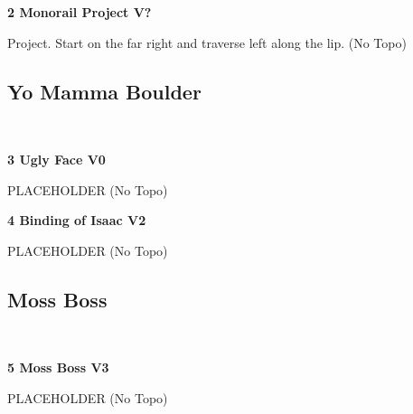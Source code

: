 \begin{multicols}{2}
					\begin{minipage}{\linewidth}	
					\label{rt:Monorail Project}
\colorbox{black!20}{
\textbf{
2 Monorail Project V?  
}
}

					\begin{adjustwidth}{0.5cm}{}				
					Project. Start on the far right and traverse left along the lip.
						\newline (No Topo) 
					\end{adjustwidth}
					\end{minipage}
			\subsection*{Yo Mamma Boulder}\label{bf:Yo Mamma Boulder}
			\begin{minipage}{\columnwidth}
			\
			\end{minipage}
			
					\begin{minipage}{\linewidth}	
					\label{rt:Ugly Face}
\colorbox{green!20}{
\textbf{
3 Ugly Face V0 \ding{72}  \warn 
}
}

					\begin{adjustwidth}{0.5cm}{}				
					PLACEHOLDER
						\newline (No Topo) 
					\end{adjustwidth}
					\end{minipage}
					\begin{minipage}{\linewidth}	
					\label{rt:Binding of Isaac}
\colorbox{green!20}{
\textbf{
4 Binding of Isaac V2  \ding{72}  \warn 
}
}

					\begin{adjustwidth}{0.5cm}{}				
					PLACEHOLDER
						\newline (No Topo) 
					\end{adjustwidth}
					\end{minipage}
			\subsection*{Moss Boss}\label{bf:Moss Boss}
			\begin{minipage}{\columnwidth}
			\
			\end{minipage}
			
					\begin{minipage}{\linewidth}	
					\label{rt:Moss Boss}
\colorbox{green!20}{
\textbf{
5 Moss Boss V3 \ding{72}  
}
}

					\begin{adjustwidth}{0.5cm}{}				
					PLACEHOLDER
						\newline (No Topo) 
					\end{adjustwidth}
					\end{minipage}

\end{multicols}
